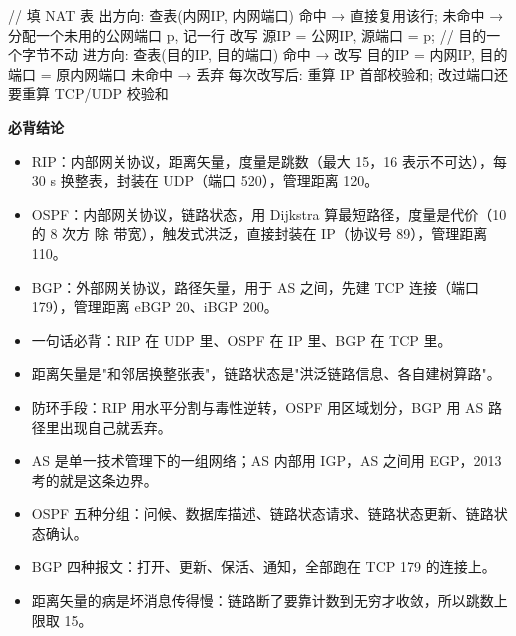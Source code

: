 \documentclass[10pt,a4paper]{ctexart}
\begin{document}
\begin{codebox}
// 填 NAT 表
出方向: 查表(内网IP, 内网端口)
        命中 → 直接复用该行; 未命中 → 分配一个未用的公网端口 p, 记一行
        改写 源IP = 公网IP, 源端口 = p;      // 目的一个字节不动
进方向: 查表(目的IP, 目的端口)
        命中 → 改写 目的IP = 内网IP, 目的端口 = 原内网端口
        未命中 → 丢弃
每次改写后: 重算 IP 首部校验和; 改过端口还要重算 TCP/UDP 校验和
\end{codebox}




\textbf{必背结论}

\begin{itemize}

\item RIP：内部网关协议，距离矢量，度量是跳数（最大 15，16 表示不可达），每 30 s 换整表，封装在 UDP（端口 520），管理距离 120。

\item OSPF：内部网关协议，链路状态，用 Dijkstra 算最短路径，度量是代价（10 的 8 次方 除 带宽），触发式洪泛，直接封装在 IP（协议号 89），管理距离 110。

\item BGP：外部网关协议，路径矢量，用于 AS 之间，先建 TCP 连接（端口 179），管理距离 eBGP 20、iBGP 200。

\item 一句话必背：RIP 在 UDP 里、OSPF 在 IP 里、BGP 在 TCP 里。

\item 距离矢量是"和邻居换整张表"，链路状态是"洪泛链路信息、各自建树算路"。

\item 防环手段：RIP 用水平分割与毒性逆转，OSPF 用区域划分，BGP 用 AS 路径里出现自己就丢弃。

\item AS 是单一技术管理下的一组网络；AS 内部用 IGP，AS 之间用 EGP，2013 考的就是这条边界。

\item OSPF 五种分组：问候、数据库描述、链路状态请求、链路状态更新、链路状态确认。

\item BGP 四种报文：打开、更新、保活、通知，全部跑在 TCP 179 的连接上。

\item 距离矢量的病是坏消息传得慢：链路断了要靠计数到无穷才收敛，所以跳数上限取 15。

\end{itemize}
\end{document}
